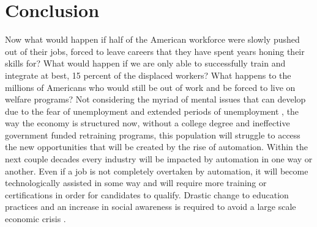 \documentclass{article}
\begin{document}
\section{Conclusion}
Now what would happen if half of the American workforce were slowly pushed out of their jobs, forced to leave careers that they have spent years honing their skills for? What would happen if we are only able to successfully train and integrate at best, 15 percent of the displaced workers? What happens to the millions of Americans who would still be out of work and be forced to live on welfare programs? Not considering the myriad of mental issues that can develop due to the fear  of unemployment \cite{3325322720201130} and extended periods of unemployment \cite{PATEL201854}, the way the economy is structured now, without a college degree and ineffective government funded retraining programs, this population will struggle to access the new opportunities that will be created by the rise of automation.
Within the next couple decades every industry will be impacted by automation in one way or another. Even if a job is not completely overtaken by automation, it will become technologically assisted in some way and will require more training or certifications in order for candidates to qualify. Drastic change to education practices and an increase in social awareness is required to avoid a large scale economic crisis \cite{edseee.911179220200401}.




\end{document}
